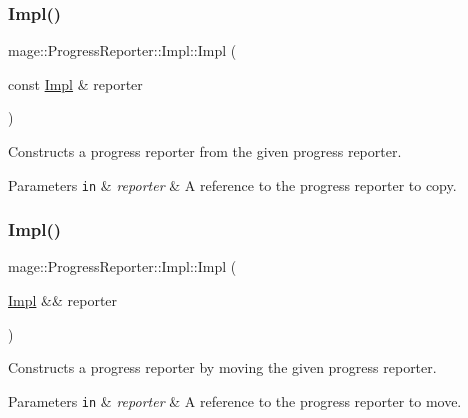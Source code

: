 \subsubsection{\texorpdfstring{Impl()}{Impl()}\hspace{0.1cm}{\footnotesize\ttfamily [2/3]}}
{\footnotesize\ttfamily mage\+::\+Progress\+Reporter\+::\+Impl\+::\+Impl (\begin{DoxyParamCaption}\item[{const \mbox{\hyperlink{classmage_1_1_progress_reporter_1_1_impl}{Impl}} \&}]{reporter }\end{DoxyParamCaption})\hspace{0.3cm}{\ttfamily [delete]}}

Constructs a progress reporter from the given progress reporter.


\begin{DoxyParams}[1]{Parameters}
\mbox{\tt in}  & {\em reporter} & A reference to the progress reporter to copy. \\
\hline
\end{DoxyParams}
\mbox{\label{classmage_1_1_progress_reporter_1_1_impl_ab3b6811ed80a087ac10c90e97730147c}} 
\subsubsection{\texorpdfstring{Impl()}{Impl()}\hspace{0.1cm}{\footnotesize\ttfamily [3/3]}}
{\footnotesize\ttfamily mage\+::\+Progress\+Reporter\+::\+Impl\+::\+Impl (\begin{DoxyParamCaption}\item[{\mbox{\hyperlink{classmage_1_1_progress_reporter_1_1_impl}{Impl}} \&\&}]{reporter }\end{DoxyParamCaption})\hspace{0.3cm}{\ttfamily [noexcept]}}

Constructs a progress reporter by moving the given progress reporter.


\begin{DoxyParams}[1]{Parameters}
\mbox{\tt in}  & {\em reporter} & A reference to the progress reporter to move. \\
\hline
\end{DoxyParams}
\mbox{\label{classmage_1_1_progress_reporter_1_1_impl_af5dbbaa059fdfc22e90e274ba14053a8}} 
